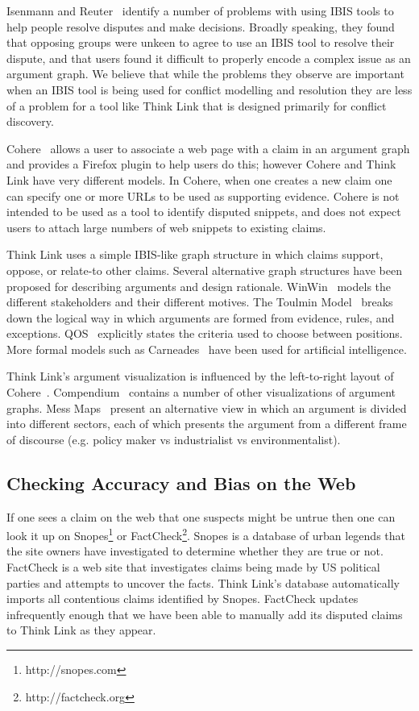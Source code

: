 \documentclass{chi2009}
\begin{document}
Isenmann and Reuter~\cite{Isenmann1997} identify a number of problems with using IBIS tools to help people resolve disputes and make decisions. Broadly speaking, they found that opposing groups were unkeen to agree to use an IBIS tool to resolve their dispute, and that users found it difficult to properly encode a complex issue as an argument graph. We believe that while the problems they observe are important when an IBIS tool is being used for conflict modelling and resolution they are less of a problem for a tool like Think Link that is designed primarily for conflict discovery.

Cohere~\cite{Shum2008} allows a user to associate a web page with a claim in an argument graph and provides a Firefox plugin to help users do this; however Cohere and Think Link have very different models. In Cohere, when one creates a new claim one can specify one or more URLs to be used as supporting evidence. Cohere is not intended to be used as a tool to identify disputed snippets, and does not expect users to attach large numbers of web snippets to existing claims.

Think Link uses a simple IBIS-like graph structure in which claims support, oppose, or relate-to other claims. Several alternative graph structures have been proposed for describing arguments and design rationale. WinWin~\cite{Boehm2006} models the different stakeholders and their different motives. The Toulmin Model~\cite{toulmin1958} breaks down the logical way in which arguments are formed from evidence, rules, and exceptions. QOS~\cite{Maclean1991} explicitly states the criteria used to choose between positions. More formal models such as Carneades~\cite{Gordon2007} have been used for artificial intelligence.

Think Link's argument visualization is influenced by the left-to-right layout of Cohere~\cite{Shum2008}. Compendium~\cite{Selvin2001} contains a number of other visualizations of argument graphs. Mess Maps~\cite{Horn2007} present an alternative view in which an argument is divided into different sectors, each of which presents the argument from a different frame of discourse (e.g. policy maker vs industrialist vs environmentalist).



\subsection{Checking Accuracy and Bias on the Web}

If one sees a claim on the web that one suspects might be untrue then one can look it up on Snopes\footnote{http://snopes.com} or FactCheck\footnote{http://factcheck.org}. Snopes is a database of urban legends that the site owners have investigated to determine whether they are true or not. FactCheck is a web site that investigates claims being made by US political parties and attempts to uncover the facts. Think Link's database automatically imports all contentious claims identified by Snopes. FactCheck updates infrequently enough that we have been able to manually add its disputed claims to Think Link as they appear.
\end{document}
